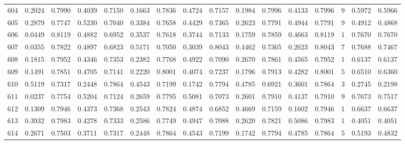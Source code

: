 \begin{tabular}{lrrrrrrrrrrrrrrr}
604 &      0.2024 &  0.7990 &  0.4039 &  0.7150 &  0.1663 &  0.7836 &  0.4724 &  0.7157 &  0.1984 &  0.7996 &   0.4133 &     0.7996 &      9 &                    0.5972 &                     0.5966 \\
605 &      0.2879 &  0.7747 &  0.5230 &  0.7040 &  0.3384 &  0.7658 &  0.4429 &  0.7365 &  0.2623 &  0.7791 &   0.4944 &     0.7791 &      9 &                    0.4912 &                     0.4868 \\
606 &      0.0449 &  0.8119 &  0.4882 &  0.6952 &  0.3537 &  0.7618 &  0.3744 &  0.7133 &  0.1759 &  0.7859 &   0.4663 &     0.8119 &      1 &                    0.7670 &                     0.7670 \\
607 &      0.0355 &  0.7822 &  0.4897 &  0.6823 &  0.5171 &  0.7050 &  0.3039 &  0.8043 &  0.4462 &  0.7365 &   0.2623 &     0.8043 &      7 &                    0.7688 &                     0.7467 \\
608 &      0.1815 &  0.7952 &  0.4346 &  0.7353 &  0.2382 &  0.7768 &  0.4922 &  0.7090 &  0.2670 &  0.7861 &   0.4565 &     0.7952 &      1 &                    0.6137 &                     0.6137 \\
609 &      0.1491 &  0.7851 &  0.4705 &  0.7141 &  0.2220 &  0.8001 &  0.4074 &  0.7237 &  0.1796 &  0.7913 &   0.4282 &     0.8001 &      5 &                    0.6510 &                     0.6360 \\
610 &      0.5119 &  0.7317 &  0.2448 &  0.7864 &  0.4543 &  0.7199 &  0.1742 &  0.7794 &  0.4785 &  0.6921 &   0.3601 &     0.7864 &      3 &                    0.2745 &                     0.2198 \\
611 &      0.0237 &  0.7754 &  0.5204 &  0.7124 &  0.2659 &  0.7795 &  0.5081 &  0.7073 &  0.2601 &  0.7910 &   0.4137 &     0.7910 &      9 &                    0.7673 &                     0.7517 \\
612 &      0.1309 &  0.7946 &  0.4373 &  0.7368 &  0.2543 &  0.7824 &  0.4874 &  0.6852 &  0.4669 &  0.7159 &   0.1602 &     0.7946 &      1 &                    0.6637 &                     0.6637 \\
613 &      0.3932 &  0.7983 &  0.4278 &  0.7333 &  0.2586 &  0.7749 &  0.4947 &  0.7088 &  0.2620 &  0.7821 &   0.5086 &     0.7983 &      1 &                    0.4051 &                     0.4051 \\
614 &      0.2671 &  0.7503 &  0.3711 &  0.7317 &  0.2448 &  0.7864 &  0.4543 &  0.7199 &  0.1742 &  0.7794 &   0.4785 &     0.7864 &      5 &                    0.5193 &                     0.4832 \\

\end{tabular}
